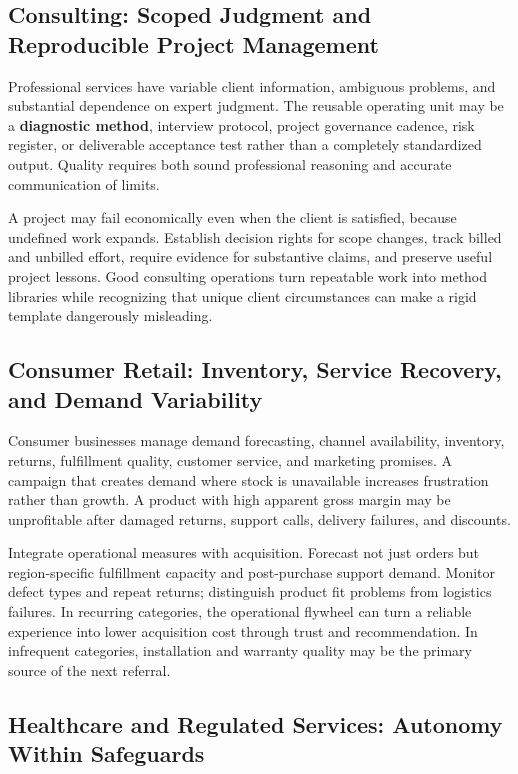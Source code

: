 \subsection{Consulting: Scoped Judgment and Reproducible Project Management}
\label{sec:arch_consulting}

Professional services have variable client information, ambiguous problems, and substantial dependence on expert judgment. The reusable operating unit may be a \textbf{diagnostic method}, interview protocol, project governance cadence, risk register, or deliverable acceptance test rather than a completely standardized output. Quality requires both sound professional reasoning and accurate communication of limits.

A project may fail economically even when the client is satisfied, because undefined work expands. Establish decision rights for scope changes, track billed and unbilled effort, require evidence for substantive claims, and preserve useful project lessons. Good consulting operations turn repeatable work into method libraries while recognizing that unique client circumstances can make a rigid template dangerously misleading.

\subsection{Consumer Retail: Inventory, Service Recovery, and Demand Variability}
\label{sec:arch_retail}

Consumer businesses manage demand forecasting, channel availability, inventory, returns, fulfillment quality, customer service, and marketing promises. A campaign that creates demand where stock is unavailable increases frustration rather than growth. A product with high apparent gross margin may be unprofitable after damaged returns, support calls, delivery failures, and discounts.

Integrate operational measures with acquisition. Forecast not just orders but region-specific fulfillment capacity and post-purchase support demand. Monitor defect types and repeat returns; distinguish product fit problems from logistics failures. In recurring categories, the operational flywheel can turn a reliable experience into lower acquisition cost through trust and recommendation. In infrequent categories, installation and warranty quality may be the primary source of the next referral.

\subsection{Healthcare and Regulated Services: Autonomy Within Safeguards}
\label{sec:arch_healthcare}

